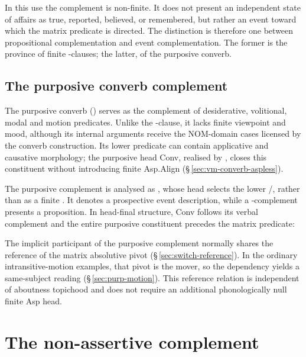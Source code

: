 In this use the complement is non-finite. It does not present an independent
state of affairs as true, reported, believed, or remembered, but rather an event
toward which the matrix predicate is directed. The distinction is therefore one
between propositional complementation and event complementation. The former is
the province of finite -clauses; the latter, of the purposive converb.

\subsection{The purposive converb complement}
\label{sec:vm-purp-comp}

The purposive converb () serves as the complement of
desiderative, volitional, modal and motion predicates. Unlike the
-clause, it lacks finite viewpoint and mood, although its internal
arguments receive the NOM-domain cases licensed by the converb construction.
Its lower predicate can contain applicative and causative morphology; the
purposive head Conv, realised by , closes this constituent without
introducing finite Asp.Align (§\,\ref{sec:vm-converb-aspless}).

The purposive complement is analysed as , whose head selects
the lower /, rather than as a finite
. It denotes a prospective event description, while a
-complement presents a proposition. In head-final structure, Conv
follows its verbal complement and the entire purposive constituent precedes
the matrix predicate:

\begin{center}
\end{center}

\noindent The implicit participant of the purposive complement normally
shares the reference of the matrix absolutive pivot
(§\,\ref{sec:switch-reference}). In the ordinary intransitive-motion
examples, that pivot is the mover, so the dependency yields a same-subject
reading (§\,\ref{sec:purp-motion}). This reference relation is independent
of aboutness topichood and does not require an additional phonologically null
finite Asp head.
\section{The non-assertive complement }\label{sec:poby}

